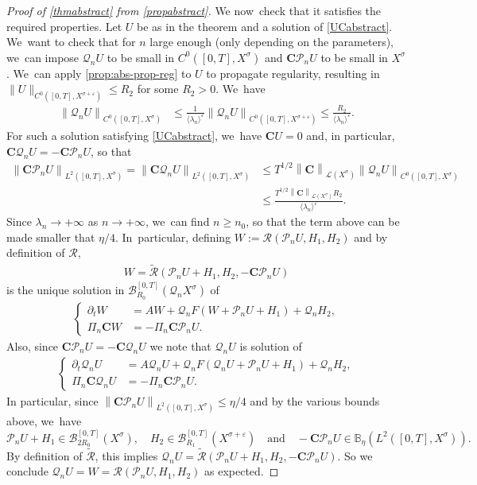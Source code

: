 \documentclass[10pt]{amsart}
\newcommand{\quand}{\quad\text{and}\quad}
\theoremstyle{definition}
\let\mc\mathcal
\let\veps\varepsilon
\newcommand{\B}{\mc{B}}
\newcommand{\Q}{\mathcal{Q}}
\renewcommand{\P}{\mathcal{P}}
\newcommand{\bC}{\boldsymbol{C}}
\providecommand{\norm}[1]{\lVert#1\rVert}
\providecommand{\inn}[1]{\langle#1\rangle}
\newcommand\nor[2]{\left\|#1\right\|_{#2}}
\begin{document}
\begin{proof}[Proof of \cref{thmabstract} from \cref{propabstract}]
We now~check that it satisfies the required properties. Let $U$ be as in the theorem and a solution of \eqref{UCabstract}. We~want to check that for $n$ large enough (only depending on the parameters), we~can impose $\Q_n U$ to be small in $C^{0}([0,T],X^{\sigma})$ and $\bC \P_n U$ to be small in $X^{\sigma}$. We~can apply \cref{prop:abs-prop-reg} to $U$ to propagate regularity, resulting in $\norm{U}_{C^0([0, T], X^{\sigma+\veps})}\leq R_{2}$ for some $R_{2}>0$. We~have
\begin{align}
\label{unifboundU}
\nor{ \Q_n U}{C^{0}([0,T],X^{\sigma})} &\leq \frac{1}{\inn{\lambda_n}^{\veps}} \nor{ \Q_n U}{C^{0}([0,T],X^{\sigma+\veps})}\leq \frac{R_{2}}{\inn{\lambda_n}^{\veps}} .
\end{align}
For such a solution satisfying \eqref{UCabstract}, we~have $\bC U=0$ and, in particular, $\bC \Q_n U=-\bC \P_n U$, so that
\begin{align*}
\nor{\bC \P_n U}{L^{2}([0,T],X^{\sigma})}=\nor{\bC \Q_n U}{L^{2}([0,T],X^{\sigma})}&\leq T^{1/2}\nor{\bC}{\mc{L}(X^\sigma)}\nor{ \Q_n U}{C^{0}([0,T],X^{\sigma})}\\
&\leq \frac{T^{1/2}\nor{\bC}{\mc{L}(X^\sigma)}R_{2}}{\inn{\lambda_n}^{\veps}} .
\end{align*}
Since $\lambda_n\to +\infty$ as $n\to +\infty$, we~can find $n\geq n_0$, so that the term above can be made smaller that $\eta/4$. In~particular, defining $W:= \mathcal{R}(\P_{n}U,H_{1},H_{2})$ and by definition of $\mathcal{R}$,
\begin{align*}
W= \mathcal{\widetilde{R}}(\P_{n}U+H_{1},H_{2},- \bC \P_{n}U)
\end{align*}
is the unique solution in $\B_{R_{0}}^{[0,T]}(\Q_n X^{\sigma})$ of
\begin{align*}
\left\{\begin{array}{rl}
\partial_t W&=AW+\Q_n F(W+\P_{n}U+H_{1})+\Q_{n}H_{2}, \\[3pt]
\Pi_n\bC W &=-\Pi_n \bC \P_{n}U.
\end{array}\right.
\end{align*}
Also, since $\bC \P_{n}U=- \bC \Q_{n}U $ we note that $\Q_n U$ is solution of
\begin{align*}
\left\{\begin{array}{rl}
\partial_t \Q_n U&=A\Q_n U+\Q_n F(\Q_n U+\P_n U+H_{1})+\Q_{n}H_{2}, \\[3pt]
\Pi_n\bC \Q_n U &=-\Pi_n \bC \P_{n}U.
\end{array}\right.
\end{align*}
In particular, since $ \nor{\bC \P_n U}{L^{2}([0,T],X^{\sigma})}\leq \eta/4$ and by the various bounds above, we~have
\[
\P_n U+H_{1}\in \B_{2R_{0}}^{[0,T]}(X^{\sigma}),\quad H_{2}\in \B_{R_{1}}^{[0,T]}(X^{\sigma+\veps})\quand-\bC \P_{n}U\in \mathbb{B}_{\eta}(L^2([0, T], X^{\sigma})).
\]
By definition of $\mathcal{\widetilde{R}}$, this implies $\Q_n U= \mathcal{\widetilde{R}}(\P_n U+H_{1},H_{2},- \bC \P_{n}U)$. So we conclude $\Q_{n}U=W=\mathcal{R}(\P_{n}U,H_{1},H_{2})$ as expected.


\end{proof}
\end{document}
